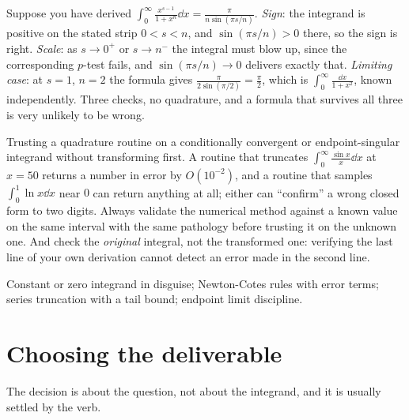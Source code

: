 \begin{worked}
Suppose you have derived $\displaystyle\int_0^{\infty}\frac{x^{s-1}}{1+x^{n}}\dd x=\frac{\pi}{n\sin(\pi s/n)}$. \emph{Sign}: the integrand is positive on the stated strip $0<s<n$, and $\sin(\pi s/n)>0$ there, so the sign is right. \emph{Scale}: as $s\to0^{+}$ or $s\to n^{-}$ the integral must blow up, since the corresponding $p$-test fails, and $\sin(\pi s/n)\to0$ delivers exactly that. \emph{Limiting case}: at $s=1$, $n=2$ the formula gives $\tfrac{\pi}{2\sin(\pi/2)}=\tfrac{\pi}{2}$, which is $\int_0^{\infty}\tfrac{\dd x}{1+x^{2}}$, known independently. Three checks, no quadrature, and a formula that survives all three is very unlikely to be wrong.
\end{worked}

\begin{trap}
Trusting a quadrature routine on a conditionally convergent or endpoint-singular integrand without transforming first. A routine that truncates $\int_0^{\infty}\tfrac{\sin x}{x}\dd x$ at $x=50$ returns a number in error by $O(10^{-2})$, and a routine that samples $\int_0^{1}\ln x\dd x$ near $0$ can return anything at all; either can ``confirm'' a wrong closed form to two digits. Always validate the numerical method against a known value on the same interval with the same pathology before trusting it on the unknown one. And check the \emph{original} integral, not the transformed one: verifying the last line of your own derivation cannot detect an error made in the second line.
\end{trap}

\begin{seealsob}Constant or zero integrand in disguise; Newton-Cotes rules with error terms; series truncation with a tail bound; endpoint limit discipline.\end{seealsob}

\section{Choosing the deliverable}

The decision is about the question, not about the integrand, and it is usually settled by the verb.

